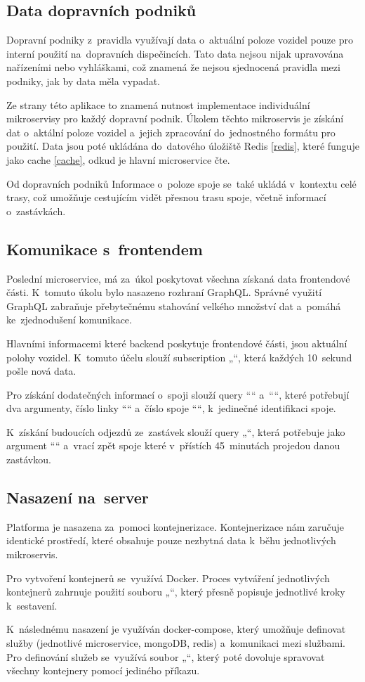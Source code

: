 \subsection {Data dopravních podniků}
Dopravní podniky z~pravidla využívají data o~aktuální poloze vozidel pouze pro interní použití na~dopravních dispečincích. Tato data nejsou nijak upravována nařízeními nebo vyhláškami, což znamená že nejsou sjednocená pravidla mezi podniky, jak by data měla vypadat.\par
Ze strany této aplikace to znamená nutnost implementace individuální mikroservisy pro každý dopravní podnik. Úkolem těchto mikroservis je získání dat o~aktální poloze vozidel a~jejich zpracování do~jednostného formátu pro použití. Data jsou poté ukládána do~datového úložiště Redis \ref{redis}, které funguje jako cache \ref{cache}, odkud je hlavní microservice čte.\par
Od dopravních podniků Informace o~poloze spoje se~také ukládá v~kontextu celé trasy, což umožňuje cestujícím vidět přesnou trasu spoje, včetně informací o~zastávkách.
\subsection {Komunikace s~frontendem}\label{mainBackend}
Poslední microservice, má za~úkol poskytovat všechna získaná data frontendové části. K~tomuto úkolu bylo nasazeno rozhraní GraphQL. Správné využití GraphQL zabraňuje přebytečnému stahování velkého množství dat a~pomáhá ke~zjednodušení komunikace. \cite{graphqlData} \par
Hlavními informacemi které backend poskytuje frontendové části, jsou aktuální polohy vozidel. K~tomuto účelu slouží subscription „“, která každých 10~sekund pošle nová data.\par
Pro získání dodatečných informací o~spoji slouží query ““ \newline a~““, které potřebují dva argumenty, číslo linky ““ \newline a~číslo spoje ““, k~jedinečné identifikaci spoje.\par
K~získání budoucích odjezdů ze~zastávek slouží query „“, která potřebuje jako argument ““ a~vrací zpět spoje které v~přístích 45~minutách projedou danou zastávkou.
\newpage
\subsection{Nasazení na~server}
Platforma je nasazena za~pomoci kontejnerizace. Kontejnerizace nám zaručuje identické prostředí, které obsahuje pouze nezbytná data k~běhu jednotlivých mikroservis.\par
Pro vytvoření kontejnerů se~využívá Docker. Proces vytváření jednotlivých kontejnerů zahrnuje použití souboru „“, který přesně popisuje jednotlivé kroky k~sestavení.\par
K~následnému nasazení je využíván docker-compose, který umožňuje definovat služby (jednotlivé microservice, mongoDB, redis) a~komunikaci mezi službami. Pro definování služeb se~využívá soubor „“, který poté dovoluje spravovat všechny kontejnery pomocí jediného příkazu.
